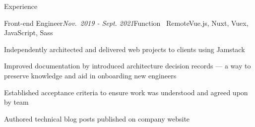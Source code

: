 \documentclass{resume} %
\begin{document}
\begin{rSection}{Experience}

\begin{rSubsection}{Front-end Engineer}{\em Nov.\ 2019 - Sept. 2021}{Function \textbar \ Remote}{Vue.js, Nuxt, Vuex, JavaScript, Sass}


\item Independently architected and delivered web projects to clients using Jamstack
\item Improved documentation by introduced architecture decision records --- a way to preserve knowledge and aid in onboarding new engineers
\item Established acceptance criteria to ensure work was understood and agreed upon by team
\item Authored technical blog posts published on company website
\end{rSubsection}


\end{rSection}
\end{document}
